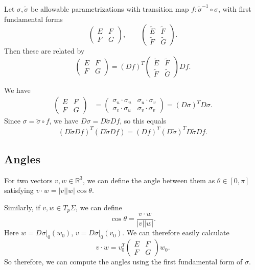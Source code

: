 \documentclass[12pt]{article}
\begin{document}
\begin{lemma}
	Let $\sigma, \tilde \sigma$ be allowable parametrizations with transition map $f : \tilde \sigma^{-1} \circ \sigma$, with first fundamental forms
	\[
	\begin{pmatrix}
		E & F \\
		F & G
	\end{pmatrix}
	, \qquad
	\begin{pmatrix}
		\tilde E & \tilde F \\
		\tilde F & \tilde G
	\end{pmatrix}
	.\]
	Then these are related by
	\[
	\begin{pmatrix}
		E & F \\
		F & G
	\end{pmatrix}
	=
	(Df)^{T}
	\begin{pmatrix}
		\tilde E & \tilde F \\
		\tilde F & \tilde G
	\end{pmatrix}
	Df
	.\]
\end{lemma}

\begin{proofbox}
	We have
	\begin{align*}
		\begin{pmatrix}
			E & F \\
			F & G
		\end{pmatrix}
		&=
		\begin{pmatrix}
			\sigma_u \cdot \sigma_u & \sigma_u \cdot \sigma_v \\
			\sigma_v \cdot \sigma_u & \sigma_v \cdot \sigma_v
		\end{pmatrix}
		= (D \sigma)^{T} D \sigma.
	\end{align*}
	Since $\sigma = \tilde \sigma \circ f$, we have $D \sigma = D \tilde \sigma D f$, so this equals
	\[
		(D \tilde \sigma D f)^{T} (D \tilde \sigma D f) = (Df)^{T} (D \tilde \sigma)^{T} D \tilde \sigma D f
	.\]
\end{proofbox}

\subsection{Angles}
\label{sub:angles}

For two vectors $v, w\in \mathbb{R}^3$, we can define the angle between them as $\theta \in [0, \pi]$ satisfying $v \cdot w = |v||w| \cos \theta$.

Similarly, if $v, w \in T_p \Sigma$, we can define
\[
\cos \theta = \frac{v \cdot w}{|v||w|}
.\]
Here $w=  D\sigma|_0(w_0)$, $v = D\sigma|_0(v_0)$. We can therefore easily calculate
\[
v \cdot w = v_0^{T}
\begin{pmatrix}
	E & F \\
	F & G
\end{pmatrix}
w_0
.\]
So therefore, we can compute the angles using the first fundamental form of $\sigma$.
\end{document}

